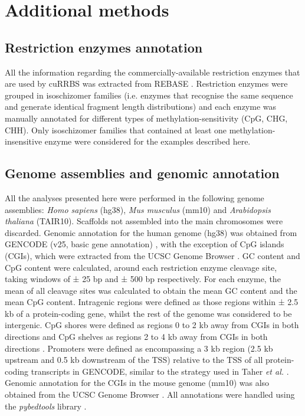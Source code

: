 \smallskip

\section{Additional methods}

\subsection*{Restriction enzymes annotation}

All the information regarding the commercially-available restriction enzymes that are used by cuRRBS was extracted from REBASE \cite{Roberts2005,Roberts2015}. Restriction enzymes were grouped in isoschizomer families (i.e. enzymes that recognise the same sequence and generate identical fragment length distributions) and each enzyme was manually annotated for different types of methylation-sensitivity (CpG, CHG, \acrshort{CHH}). Only isoschizomer families that contained at least one methylation-insensitive enzyme were considered for the examples described here.

\subsection*{Genome assemblies and genomic annotation}

All the analyses presented here were performed in the following genome assemblies: \textit{Homo sapiens} (hg38), \textit{Mus musculus} (mm10) and \textit{Arabidopsis thaliana} (TAIR10). Scaffolds not assembled into the main chromosomes were discarded. Genomic annotation for the human genome (hg38) was obtained from GENCODE (v25, basic gene annotation) \cite{Harrow2012}, with the exception of CpG islands (CGIs), which were extracted from the UCSC Genome Browser \cite{Bock2007}. GC content and CpG content were calculated, around each restriction enzyme cleavage site, taking windows of  ± 25 bp and ± 500 bp respectively. For each enzyme, the mean of all cleavage sites was calculated to obtain the mean GC content and the mean CpG content. Intragenic regions were defined as those regions within ± 2.5 \acrshort{kb} of a protein-coding gene, whilst the rest of the genome was considered to be intergenic. CpG shores were defined as regions 0 to 2 kb away from CGIs in both directions and CpG shelves as regions 2 to 4 kb away from CGIs in both directions \cite{Zhang2015}. Promoters were defined as encompassing a 3 kb region (2.5 kb upstream and 0.5 kb downstream of the  \acrshort{TSS}) relative to the TSS of all protein-coding transcripts in GENCODE, similar to the strategy used in Taher \textit{et al.} \cite{Taher2013}. Genomic annotation for the CGIs in the mouse genome (mm10) was also obtained from the UCSC Genome Browser \cite{Bock2007}. All annotations were handled using the \textit{pybedtools} library \cite{Quinlan2011,Quinlan2010}.

